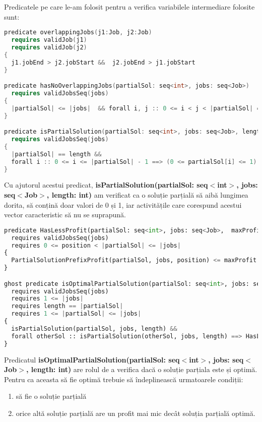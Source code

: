 Predicatele pe care le-am folosit pentru a verifica variabilele intermediare folosite sunt: 
\begin{lstlisting}[language=C++]
predicate overlappingJobs(j1:Job, j2:Job)
  requires validJob(j1)
  requires validJob(j2)
{
  j1.jobEnd > j2.jobStart &&  j2.jobEnd > j1.jobStart 
}

predicate hasNoOverlappingJobs(partialSol: seq<int>, jobs: seq<Job>)
  requires validJobsSeq(jobs)
{
  |partialSol| <= |jobs|  && forall i, j :: 0 <= i < j < |partialSol| ==> (partialSol[i] == 1 && partialSol[j] == 1) ==> !overlappingJobs(jobs[i], jobs[j])
}

predicate isPartialSolution(partialSol: seq<int>, jobs: seq<Job>, length: int)
  requires validJobsSeq(jobs)
{   
  |partialSol| == length &&
  forall i :: 0 <= i <= |partialSol| - 1 ==> (0 <= partialSol[i] <= 1) && hasNoOverlappingJobs(partialSol, jobs)
}
\end{lstlisting}

Cu ajutorul acestui predicat, \textbf{isPartialSolution(partialSol: seq$<$int$>$, jobs: seq$<$Job$>$, length: int)} am verificat ca o soluție parțială să aibă lungimea dorita, să conțină doar valori de 0 și 1, iar activitățile care corespund acestui vector caracteristic să nu se suprapună. 

\begin{lstlisting}[language=Python]
predicate HasLessProfit(partialSol: seq<int>, jobs: seq<Job>,  maxProfit: int, position: int)
  requires validJobsSeq(jobs)
  requires 0 <= position < |partialSol| <= |jobs|
{
  PartialSolutionPrefixProfit(partialSol, jobs, position) <= maxProfit
}

ghost predicate isOptimalPartialSolution(partialSol: seq<int>, jobs: seq<Job>, length: int)
  requires validJobsSeq(jobs)
  requires 1 <= |jobs| 
  requires length == |partialSol|
  requires 1 <= |partialSol| <= |jobs|
{
  isPartialSolution(partialSol, jobs, length) &&
  forall otherSol :: isPartialSolution(otherSol, jobs, length) ==> HasLessProfit(otherSol, jobs, PartialSolutionPrefixProfit(partialSol, jobs, 0), 0)
}
\end{lstlisting}
Predicatul \textbf{isOptimalPartialSolution(partialSol: seq$<$int$>$, jobs: seq$<$Job$>$, length: int)} are rolul de a verifica dacă o soluție parțiala este și optimă. Pentru ca aceasta să fie optimă trebuie să îndeplinească urmatoarele condiții:
\begin{enumerate}
    \item să fie o soluție parțială
    \item orice altă soluție parțială are un profit mai mic decât soluția parțială optimă.
\end{enumerate}


